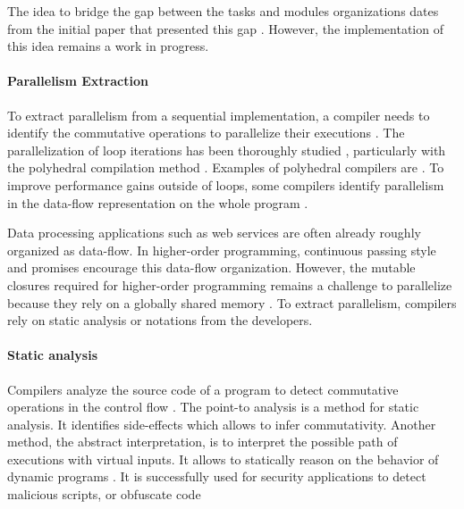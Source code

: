 The idea to bridge the gap between the tasks and modules organizations dates from the initial paper that presented this gap \cite{Parnas1972}.
However, the implementation of this idea remains a work in progress.


\paragraph{Parallelism Extraction}

To extract parallelism from a sequential implementation, a compiler needs to identify the commutative operations to parallelize their executions \cite{Rinard1996,Clements2013a}.
The parallelization of loop iterations has been thoroughly studied \cite{Mauras1989,Amarasinghe1995,Chen2008,Banerjee2013,Radoi2014}, particularly with the polyhedral compilation method \cite{Bastoul2004}.
Examples of polyhedral compilers are .
To improve performance gains outside of loops, some compilers identify parallelism in the data-flow representation on the whole program \cite{Beck1991,Catanzaro2009,Li2012}.

Data processing applications \cite{Fernandez2014a} such as web services \cite{Salmito2013} are often already roughly organized as data-flow.
In higher-order programming, continuous passing style and promises encourage this data-flow organization.
However, the mutable closures required for higher-order programming remains a challenge to parallelize because they rely on a globally shared memory \cite{Harrison1989, Nicolay2010, Matsakis2012a}.
To extract parallelism, compilers rely on static analysis or notations from the developers.


\paragraph{Static analysis}

Compilers analyze the source code of a program to detect commutative operations in the control flow \cite{Allen1970}.
The point-to analysis is a method for static analysis.
It identifies side-effects \cite{Andersen1994,Jang2009,Sridharan2012,Wei2014} which allows to infer commutativity.
Another method, the abstract interpretation, is to interpret the possible path of executions with virtual inputs.
It allows to statically reason on the behavior of dynamic programs \cite{Maffeis2008,Smith2011,Gardner2012,Hackett2012,Raychev2013,Gardner2013,Bodin2014}.
It is successfully used for security applications to detect malicious scripts, or obfuscate code \cite{Huang2004,Jovanovic2006,Yu2007,Maffeis2009a,Chudnov2015,Dolby2015}

